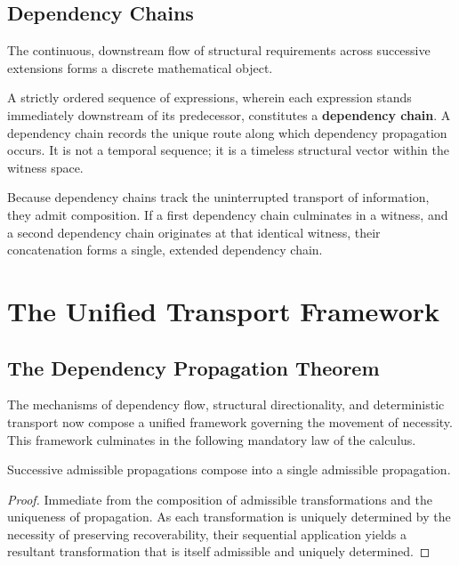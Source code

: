 \documentclass[12pt,anyside]{book}
\begin{document}
\subsection{Dependency Chains}
The continuous, downstream flow of structural requirements across successive extensions forms a discrete mathematical object. 

A strictly ordered sequence of expressions, wherein each expression stands immediately downstream of its predecessor, constitutes a \textbf{dependency chain}. A dependency chain records the unique route along which dependency propagation occurs. It is not a temporal sequence; it is a timeless structural vector within the witness space.

Because dependency chains track the uninterrupted transport of information, they admit composition. If a first dependency chain culminates in a witness, and a second dependency chain originates at that identical witness, their concatenation forms a single, extended dependency chain. 

\section{The Unified Transport Framework}

\subsection{The Dependency Propagation Theorem}
The mechanisms of dependency flow, structural directionality, and deterministic transport now compose a unified framework governing the movement of necessity. This framework culminates in the following mandatory law of the calculus.

\begin{theorem}
Successive admissible propagations compose into a single admissible propagation.
\end{theorem}
\begin{proof}
Immediate from the composition of admissible transformations and the uniqueness of propagation. As each transformation is uniquely determined by the necessity of preserving recoverability, their sequential application yields a resultant transformation that is itself admissible and uniquely determined.
\end{proof}
\end{document}
